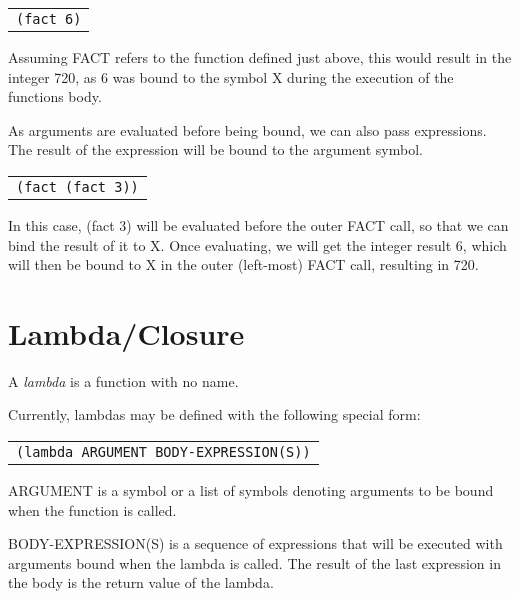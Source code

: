 \documentclass[
letterpaper,
oneside,
]{memoir}
\begin{document}
\vspace{1em}
\begin{tabular}{l}
  \texttt{(fact 6)} \\
\end{tabular}
\vspace{1em}

\noindent
Assuming FACT refers to the function defined just above, this would result in the integer 720, as 6 was bound to the symbol X during the execution of the functions body.

\vspace{1em}
\noindent
As arguments are evaluated before being bound, we can also pass expressions. The result of the expression will be bound to the argument symbol.

\vspace{1em}
\begin{tabular}{l}
  \texttt{(fact (fact 3))} \\
\end{tabular}
\vspace{1em}

\noindent
In this case, (fact 3) will be evaluated before the outer FACT call, so that we can bind the result of it to X. Once evaluating, we will get the integer result 6, which will then be bound to X in the outer (left-most) FACT call, resulting in 720.

\section{Lambda/Closure}

A \emph{lambda} is a function with no name.

Currently, lambdas may be defined with the following special form:

\vspace{1em}
\begin{tabular}{l}
  \texttt{(lambda ARGUMENT BODY-EXPRESSION(S))} \\
\end{tabular}
\vspace{1em}

\noindent
ARGUMENT is a symbol or a list of symbols denoting arguments to be bound when the function is called.


\vspace{1em}
\noindent
BODY-EXPRESSION(S) is a sequence of expressions that will be executed with arguments bound when the lambda is called. The result of the last expression in the body is the return value of the lambda.
\end{document}
